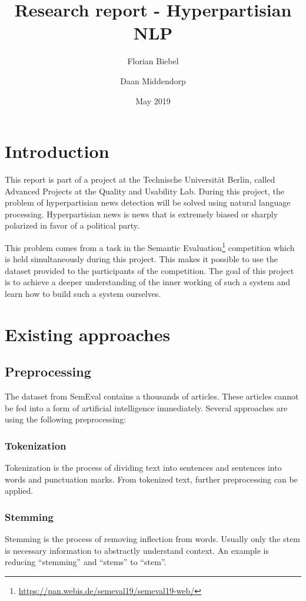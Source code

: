 \documentclass{article}
\title{Research report - Hyperpartisian NLP}
\author{Florian Biebel \and Daan Middendorp}
\date{May 2019}
\begin{document}
\maketitle

\section{Introduction}
This report is part of a project at the Technische Universität Berlin, called Advanced Projects at the Quality and Usability Lab. During this project, the problem of hyperpartisian news detection will be solved using natural language processing. Hyperpartisian news is news that is extremely biased or sharply polarized in favor of a political party.

This problem comes from a task in the Semantic Evaluation\footnote{\url{https://pan.webis.de/semeval19/semeval19-web/}} competition which is held simultaneously during this project. This makes it possible to use the dataset provided to the participants of the competition. The goal of this project is to achieve a deeper understanding of the inner working of such a system and learn how to build such a system ourselves.

\section{Existing approaches}
\subsection{Preprocessing}
The dataset from SemEval contains a thousands of articles. These articles cannot be fed into a form of artificial intelligence immediately. Several approaches are using the following preprocessing:

\subsubsection{Tokenization}
Tokenization is the process of dividing text into sentences and sentences into words and punctuation marks.
From tokenized text, further preprocessing can be applied.

\subsubsection{Stemming}
Stemming is the process of removing inflection from words.
Usually only the stem is necessary information to abstractly understand context.
An example is reducing ``stemming'' and ``stems'' to ``stem''.
\end{document}
